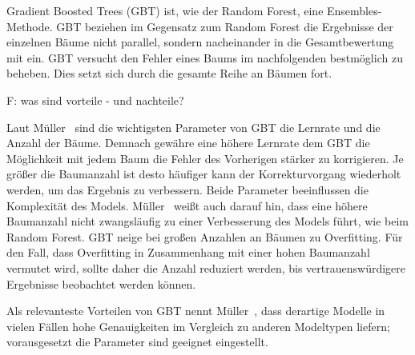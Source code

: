 Gradient Boosted Trees (GBT) ist, wie der Random Forest, eine Ensembles-Methode. GBT beziehen im Gegensatz zum Random Forest die Ergebnisse der einzelnen Bäume nicht parallel, sondern nacheinander in die Gesamtbewertung mit ein. GBT versucht den Fehler eines Baums im nachfolgenden bestmöglich zu beheben. Dies setzt sich durch die gesamte Reihe an Bäumen fort.

F: was sind vorteile - und nachteile?

Laut Müller~\cite{Muller.2017} sind die wichtigsten Parameter von GBT die Lernrate und die Anzahl der Bäume. Demnach gewähre eine höhere Lernrate dem GBT die Möglichkeit mit jedem Baum die Fehler des Vorherigen stärker zu korrigieren. Je größer die Baumanzahl ist desto häufiger kann der Korrekturvorgang wiederholt werden, um das Ergebnis zu verbessern. Beide Parameter beeinflussen die Komplexität des Models. Müller~\cite{Muller.2017} weißt auch darauf hin, dass eine höhere Baumanzahl nicht zwangsläufig zu einer Verbesserung des Models führt, wie beim Random Forest. GBT neige bei großen Anzahlen an Bäumen zu Overfitting. Für den Fall, dass Overfitting in Zusammenhang mit einer hohen Baumanzahl vermutet wird, sollte daher die Anzahl reduziert werden, bis vertrauenswürdigere Ergebnisse beobachtet werden können.

Als relevanteste Vorteilen von GBT nennt Müller~\cite{Muller.2017}, dass derartige Modelle in vielen Fällen hohe Genauigkeiten im Vergleich zu anderen Modeltypen liefern; vorausgesetzt die Parameter sind geeignet eingestellt.
